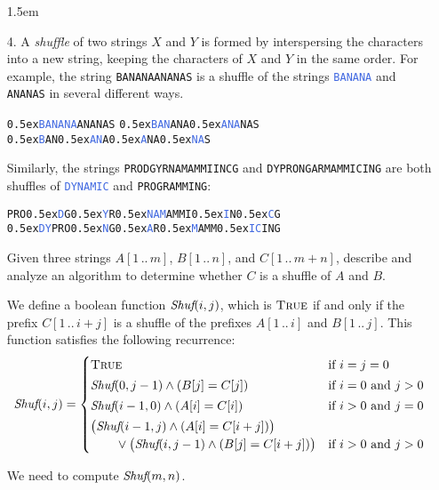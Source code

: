\documentclass[11pt]{article}
\def\Sym#1{\texttt{\upshape\textcolor{BrickRed}{#1}}}
\def\SymBlue#1{\texttt{\upshape\textcolor{RoyalBlue}{#1}}}
\def\u#1{\raise0.5ex\hbox{\textcolor{RoyalBlue}{#1}}}
\begin{document}
\begin{enumerate}\parindent 1.5em
\item[4.]
A \emph{shuffle} of two strings $X$ and $Y$ is formed by interspersing the characters into a new string, keeping the characters of $X$ and $Y$ in the same order. For example, the string \Sym{BANANAANANAS} is a shuffle of the strings \SymBlue{BANANA} and \Sym{ANANAS} in several different ways.
\begin{center}
	\Sym{\u{BANANA}ANANAS}
	\qquad
	\Sym{\u{BAN}ANA\u{ANA}NAS}
	\qquad
	\Sym{\u{B}AN\u{AN}A\u{A}NA\u{NA}S}
\end{center}
Similarly, the strings \Sym{PRODGYRNAMAMMIINCG} and \Sym{DYPRONGARMAMMICING} are both shuffles of \SymBlue{DYNAMIC} and \Sym{PROGRAMMING}:
\begin{center}
	\Sym{PRO\u{D}G\u{Y}R\u{NAM}AMMI\u{I}N\u{C}G}
	\qquad
	\qquad
	\Sym{\u{DY}PRO\u{N}G\u{A}R\u{M}AMM\u{IC}ING}
\end{center}
Given three strings $A[1\,..\,m]$, $B[1\,..\,n]$, and $C[1\,..\,m+n]$, describe and analyze an algorithm to determine whether $C$ is a shuffle of $A$ and $B$.

\begin{solution}
We define a boolean function $\emph{Shuf}(i,j)$, which is $\textsc{True}$ if and only if the prefix $C[1\,..\,i+j]$ is a shuffle of the prefixes $A[1\,..\,i]$ and $B[1\,..\,j]$.  This function satisfies the following recurrence:
\[
	\emph{Shuf}(i,j) = 
	\begin{cases}
		\textsc{True} & \text{if $i=j=0$}
\\[0.5ex]
		\emph{Shuf}(0,j-1) \strut\land (B[j]=C[j]) & \text{if $i=0$ and $j>0$}
\\[0.5ex]
		\emph{Shuf}(i-1,0) \strut\land (A[i]=C[i]) & \text{if $i>0$ and $j=0$}
\\[0.5ex]
		\left(\emph{Shuf}(i-1,j) \strut\land (A[i]=C[i+j])\right)
\\
			\qquad {}\lor \left(\emph{Shuf}(i,j-1) \strut\land (B[j]=C[i+j])\right)
			& \text{if $i>0$ and $j>0$}
	\end{cases}
\]

We need to compute $\emph{Shuf}(m,n)$.


\end{solution}
\end{enumerate}
\end{document}
